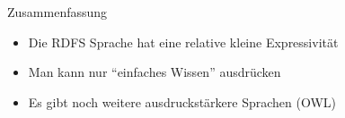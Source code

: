 \documentclass{beamer}
\begin{document}
\begin{frame}{Zusammenfassung}
	
	\begin{itemize}
		\item Die RDFS Sprache hat eine relative kleine Expressivität
		\item Man kann nur ``einfaches Wissen'' ausdrücken
		\item Es gibt noch weitere ausdruckstärkere Sprachen (OWL) 
	\end{itemize}
	
\end{frame}
\end{document}
